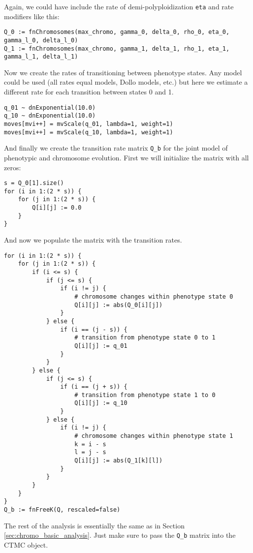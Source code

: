 Again, we could have include the rate of demi-polyploidization \texttt{eta}
and rate modifiers like this:
{\tt \begin{snugshade*}
\begin{lstlisting}
Q_0 := fnChromosomes(max_chromo, gamma_0, delta_0, rho_0, eta_0, gamma_l_0, delta_l_0) 
Q_1 := fnChromosomes(max_chromo, gamma_1, delta_1, rho_1, eta_1, gamma_l_1, delta_l_1) 
\end{lstlisting}
\end{snugshade*}}
Now we create the rates of transitioning between phenotype states.
Any model could be used (all rates equal models, Dollo models, etc.)
but here we estimate a different rate for each transition between states 0 and 1.
{\tt \begin{snugshade*}
\begin{lstlisting}
q_01 ~ dnExponential(10.0)
q_10 ~ dnExponential(10.0)
moves[mvi++] = mvScale(q_01, lambda=1, weight=1)
moves[mvi++] = mvScale(q_10, lambda=1, weight=1)
\end{lstlisting}
\end{snugshade*}}
And finally we create the transition rate matrix \texttt{Q\_b} 
for the joint model of phenotypic and chromosome evolution.
First we will initialize the matrix with all zeros:
{\tt \begin{snugshade*}
\begin{lstlisting}
s = Q_0[1].size()
for (i in 1:(2 * s)) {
    for (j in 1:(2 * s)) {
        Q[i][j] := 0.0
    }
}
\end{lstlisting}
\end{snugshade*}}
And now we populate the matrix with the transition rates.
{\tt \begin{snugshade*}
\begin{lstlisting}
for (i in 1:(2 * s)) {
    for (j in 1:(2 * s)) {
        if (i <= s) {
            if (j <= s) {
                if (i != j) {
                    # chromosome changes within phenotype state 0
                    Q[i][j] := abs(Q_0[i][j])
                }
            } else {
                if (i == (j - s)) {
                    # transition from phenotype state 0 to 1
                    Q[i][j] := q_01
                }
            }
        } else {
            if (j <= s) {
                if (i == (j + s)) {
                    # transition from phenotype state 1 to 0
                    Q[i][j] := q_10
                }
            } else {
                if (i != j) {
                    # chromosome changes within phenotype state 1
                    k = i - s
                    l = j - s
                    Q[i][j] := abs(Q_1[k][l])
                }
            }
        }
    }
}
Q_b := fnFreeK(Q, rescaled=false)
\end{lstlisting}
\end{snugshade*}}
The rest of the analysis is essentially
the same as in Section \ref{sec:chromo_basic_analysis}. Just make sure
to pass the \texttt{Q\_b} matrix into the CTMC object.

